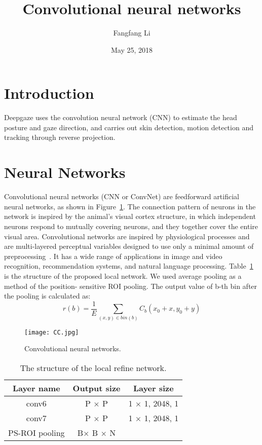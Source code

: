 \documentclass{article}
\title{Convolutional neural networks}
\author{Fangfang Li}
\date{May 25, 2018}
\begin{document}
\twocolumn
\maketitle
\section{Introduction}

 Deepgaze uses the convolution neural network (CNN) to estimate the head posture and gaze direction, and carries out skin detection, motion detection and tracking through reverse projection.

\section{Neural Networks}
Convolutional neural networks (CNN or ConvNet) are feedforward artificial neural networks, as shown in Figure~\ref{1}. The connection pattern of neurons in the network is inspired by the animal's visual cortex structure, in which independent neurons respond to mutually covering neurons, and they together cover the entire visual area. Convolutional networks are inspired by physiological processes and are multi-layered perceptual variables designed to use only a minimal amount of preprocessing~\cite{Lawrence1997Face}. It has a wide range of applications in image and video recognition, recommendation systems, and natural language processing. Table~\ref{table1} is the structure of the proposed local network. We used average pooling as a method of the position-
sensitive ROI pooling. The output value of b-th bin after the
pooling is calculated as:
\begin{equation}
r(b)=\frac{1}{E}\sum_{(x,y) \in bin(b)} C_b(x_0^{}+x,y_0^{}+y)
\end{equation}

\begin{figure}[!htb]
\centering
\texttt{[image: CC.jpg]}
\caption{Convolutional neural networks. }
\label{1}
\end{figure}

\begin{table}[!htb]
\caption{The structure of the local refine network. }
\label{table1}
\begin{tabular}{ccc}
\hline
Layer name 	&Output size	                   &Layer size\\
\hline
conv6             &P × P                           &1 × 1, 2048, 1\\
conv7             &P × P                            &1 × 1, 2048, 1 \\
PS-ROI pooling    &B× B × N                        & \\
\hline
\end{tabular}
\end{table}

\end{document}
